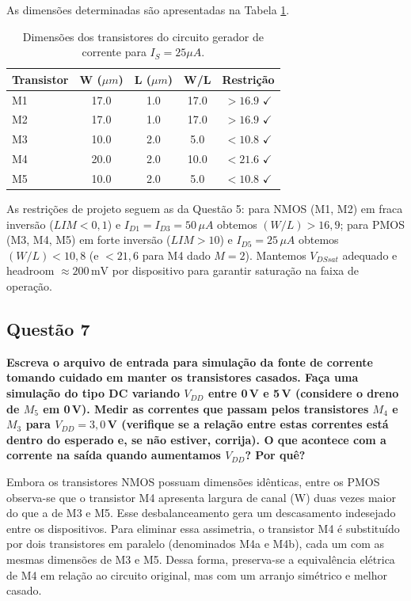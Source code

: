 ﻿\documentclass[12pt,a4paper]{article}
\begin{document}
As dimensões determinadas são apresentadas na Tabela \ref{tab:dimensoes}.

\begin{table}[H]
\centering
\caption{Dimensões dos transistores do circuito gerador de corrente para $I_S = 25\mu A$.}
\label{tab:dimensoes}
\begin{tabular}{@{}lcccc@{}}
    \toprule
    \textbf{Transistor} & \textbf{W ($\mu m$)} & \textbf{L ($\mu m$)} & \textbf{W/L} & \textbf{Restrição} \\\midrule
M1 & 17.0 & 1.0 & 17.0 & $> 16.9$ $\checkmark$ \\
M2 & 17.0 & 1.0 & 17.0 & $> 16.9$ $\checkmark$ \\
M3 & 10.0 & 2.0 & 5.0 & $< 10.8$ $\checkmark$ \\
M4 & 20.0 & 2.0 & 10.0 & $< 21.6$ $\checkmark$ \\
M5 & 10.0 & 2.0 & 5.0 & $< 10.8$ $\checkmark$ \\
\bottomrule
\end{tabular}
\end{table}

As restrições de projeto seguem as da Questão 5: para NMOS (M1, M2) em fraca inversão ($LIM<0{,}1$) e $I_{D1}=I_{D3}=50\,\mu A$ obtemos $(W/L)>16{,}9$; para PMOS (M3, M4, M5) em forte inversão ($LIM>10$) e $I_{D5}=25\,\mu A$ obtemos $(W/L)<10{,}8$ (e $<21{,}6$ para M4 dado $M=2$). Mantemos $V_{DSsat}$ adequado e headroom $\approx 200\,\text{mV}$ por dispositivo para garantir saturação na faixa de operação.

\subsection*{Questão 7}
\begin{BoxQ}
	\textbf{Escreva o arquivo de entrada para simulação da fonte de corrente tomando cuidado em manter os transistores casados. Faça uma simulação do tipo DC variando $V_{DD}$ entre 0\,V e 5\,V (considere o dreno de $M_{5}$ em 0\,V). Medir as correntes que passam pelos transistores $M_{4}$ e $M_{3}$ para $V_{DD} = 3{,}0$\,V (verifique se a relação entre estas correntes está dentro do esperado e, se não estiver, corrija). O que acontece com a corrente na saída quando aumentamos $V_{DD}$? Por quê?}
\end{BoxQ}\par

Embora os transistores NMOS possuam dimensões idênticas, entre os PMOS observa-se que o transistor M4 apresenta largura de canal (W) duas vezes maior do que a de M3 e M5. Esse desbalanceamento gera um descasamento indesejado entre os dispositivos. Para eliminar essa assimetria, o transistor M4 é substituído por dois transistores em paralelo (denominados M4a e M4b), cada um com as mesmas dimensões de M3 e M5. Dessa forma, preserva-se a equivalência elétrica de M4 em relação ao circuito original, mas com um arranjo simétrico e melhor casado.
\end{document}
